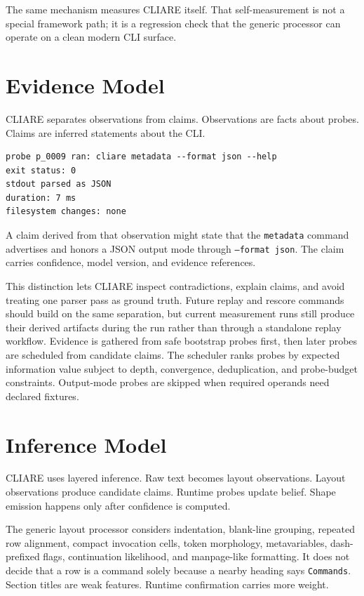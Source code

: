 \documentclass[11pt]{article}
\begin{document}
The same mechanism measures CLIARE itself. That self-measurement is not a special framework path; it is a regression check that the generic processor can operate on a clean modern CLI surface.

\section{Evidence Model}

CLIARE separates observations from claims. Observations are facts about probes. Claims are inferred statements about the CLI.

\begin{verbatim}
probe p_0009 ran: cliare metadata --format json --help
exit status: 0
stdout parsed as JSON
duration: 7 ms
filesystem changes: none
\end{verbatim}

A claim derived from that observation might state that the \texttt{metadata} command advertises and honors a JSON output mode through \texttt{--format json}. The claim carries confidence, model version, and evidence references.

This distinction lets CLIARE inspect contradictions, explain claims, and avoid treating one parser pass as ground truth. Future replay and rescore commands should build on the same separation, but current measurement runs still produce their derived artifacts during the run rather than through a standalone replay workflow. Evidence is gathered from safe bootstrap probes first, then later probes are scheduled from candidate claims. The scheduler ranks probes by expected information value subject to depth, convergence, deduplication, and probe-budget constraints. Output-mode probes are skipped when required operands need declared fixtures.

\section{Inference Model}

CLIARE uses layered inference. Raw text becomes layout observations. Layout observations produce candidate claims. Runtime probes update belief. Shape emission happens only after confidence is computed.

The generic layout processor considers indentation, blank-line grouping, repeated row alignment, compact invocation cells, token morphology, metavariables, dash-prefixed flags, continuation likelihood, and manpage-like formatting. It does not decide that a row is a command solely because a nearby heading says \texttt{Commands}. Section titles are weak features. Runtime confirmation carries more weight.
\end{document}
